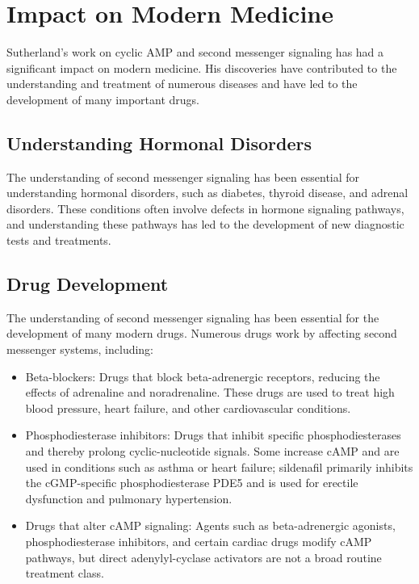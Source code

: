 \section{Impact on Modern Medicine}

Sutherland's work on cyclic AMP and second messenger signaling has had a significant impact on modern medicine. His discoveries have contributed to the understanding and treatment of numerous diseases and have led to the development of many important drugs.

\subsection{Understanding Hormonal Disorders}

The understanding of second messenger signaling has been essential for understanding hormonal disorders, such as diabetes, thyroid disease, and adrenal disorders. These conditions often involve defects in hormone signaling pathways, and understanding these pathways has led to the development of new diagnostic tests and treatments.

\subsection{Drug Development}

The understanding of second messenger signaling has been essential for the development of many modern drugs. Numerous drugs work by affecting second messenger systems, including:

\begin{itemize}
\item Beta-blockers: Drugs that block beta-adrenergic receptors, reducing the effects of adrenaline and noradrenaline. These drugs are used to treat high blood pressure, heart failure, and other cardiovascular conditions.
\item Phosphodiesterase inhibitors: Drugs that inhibit specific phosphodiesterases and thereby prolong cyclic-nucleotide signals. Some increase cAMP and are used in conditions such as asthma or heart failure; sildenafil primarily inhibits the cGMP-specific phosphodiesterase PDE5 and is used for erectile dysfunction and pulmonary hypertension.
\item Drugs that alter cAMP signaling: Agents such as beta-adrenergic agonists, phosphodiesterase inhibitors, and certain cardiac drugs modify cAMP pathways, but direct adenylyl-cyclase activators are not a broad routine treatment class.
\end{itemize}

